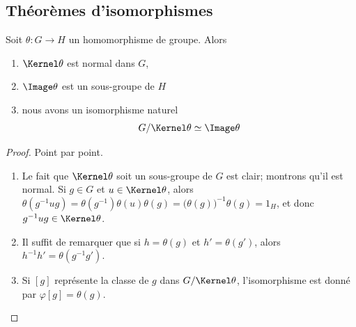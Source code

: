 \subsection{Théorèmes d'isomorphismes}

\begin{theorem}        \label{ThoPremierthoisomo}
    Soit \( \theta\colon G\to H\) un homomorphisme de groupe. Alors
    \begin{enumerate}
        \item
            \( \Kernel\theta\) est normal dans \( G\),
        \item
            \( \Image \theta\) est un sous-groupe de \( H\)
        \item   \label{ItemWLCLdk}
            nous avons un isomorphisme naturel
            \begin{equation}
                G/\Kernel\theta\simeq \Image\theta
            \end{equation}
    \end{enumerate}
\end{theorem}

\begin{proof}
    Point par point.
    \begin{enumerate}
        \item
            Le fait que  \( \Kernel\theta\) soit un sous-groupe de \( G\) est clair; montrons qu'il est normal. Si \( g \in G \) et \( u \in \Kernel\theta\), alors \(\theta (g^{-1} u g) = \theta(g^{-1})\theta(u)\theta(g) = \bigl(\theta(g)\bigr)^{-1}\theta(g) = 1_H \), et donc \( g^{-1} u g \in \Kernel\theta\).
        \item
            Il suffit de remarquer que si \( h = \theta(g) \) et \( h' = \theta(g') \), alors \( h^{-1} h' = \theta(g^{-1} g') \).
        \item
            Si \( [g]\) représente la classe de \( g\) dans \( G/\Kernel\theta\), l'isomorphisme est donné par \( \varphi[g]=\theta(g)\).
    \end{enumerate}
\end{proof}

